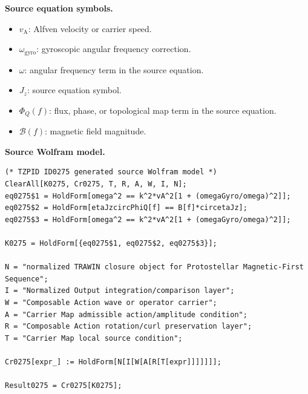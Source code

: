 \begin{minipage}[t]{0.49\linewidth}
\begingroup
\small
\raggedright
\textbf{Source equation symbols.}\par
\begin{itemize}[leftmargin=1.35em,itemsep=1pt,topsep=1pt,parsep=0pt]
    \item $v_{\mathrm{A}}$: Alfven velocity or carrier speed.
    \item $\omega_{\mathrm{gyro}}$: gyroscopic angular frequency correction.
    \item $\omega$: angular frequency term in the source equation.
    \item $J_z$: source equation symbol.
    \item $\Phi_Q(f)$: flux, phase, or topological map term in the source equation.
    \item $\mathcal{B}(f)$: magnetic field magnitude.
\end{itemize}
\endgroup
\end{minipage}\hfill
\begin{minipage}[t]{0.47\linewidth}
\begingroup
\scriptsize
\raggedright
\textbf{Source Wolfram model.}\par
\begin{Verbatim}[fontsize=\tiny,breaklines=true,breakanywhere=true]
(* TZPID ID0275 generated source Wolfram model *)
ClearAll[K0275, Cr0275, T, R, A, W, I, N];
eq0275$1 = HoldForm[omega^2 == k^2*vA^2[1 + (omegaGyro/omega)^2]];
eq0275$2 = HoldForm[etaJzcircPhiQ[f] == B[f]*circetaJz];
eq0275$3 = HoldForm[omega^2 == k^2*vA^2[1 + (omegaGyro/omega)^2]];

K0275 = HoldForm[{eq0275$1, eq0275$2, eq0275$3}];

N = "normalized TRAWIN closure object for Protostellar Magnetic-First Sequence";
I = "Normalized Output integration/comparison layer";
W = "Composable Action wave or operator carrier";
A = "Carrier Map admissible action/amplitude condition";
R = "Composable Action rotation/curl preservation layer";
T = "Carrier Map local source condition";

Cr0275[expr_] := HoldForm[N[I[W[A[R[T[expr]]]]]]];

Result0275 = Cr0275[K0275];
\end{Verbatim}
\endgroup
\end{minipage}

